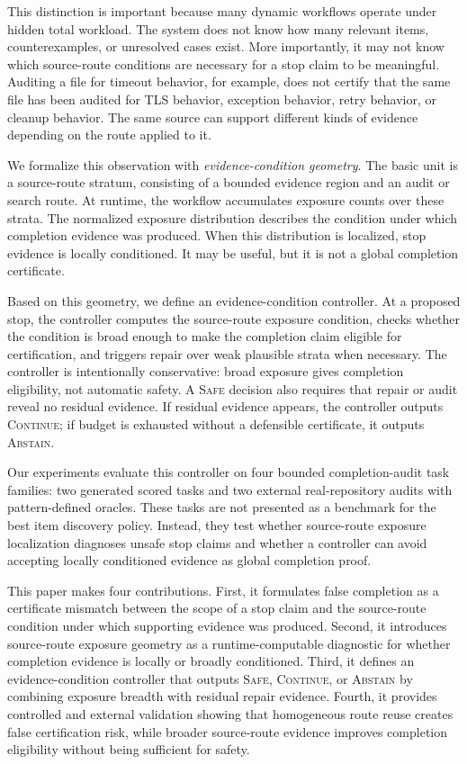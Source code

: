 \documentclass[letterpaper,10pt,twocolumn]{article}
\newcommand{\safe}{\textsc{Safe}}
\newcommand{\cont}{\textsc{Continue}}
\newcommand{\abstain}{\textsc{Abstain}}
\begin{document}
This distinction is important because many dynamic workflows operate under hidden
total workload. The system does not know how many relevant items,
counterexamples, or unresolved cases exist. More importantly, it may not know
which source-route conditions are necessary for a stop claim to be meaningful.
Auditing a file for timeout behavior, for example, does not certify that the same
file has been audited for TLS behavior, exception behavior, retry behavior, or
cleanup behavior. The same source can support different kinds of evidence
depending on the route applied to it.

We formalize this observation with \emph{evidence-condition geometry}. The basic
unit is a source-route stratum, consisting of a bounded evidence region and an
audit or search route. At runtime, the workflow accumulates exposure counts over
these strata. The normalized exposure distribution describes the condition under
which completion evidence was produced. When this distribution is localized,
stop evidence is locally conditioned. It may be useful, but it is not a global
completion certificate.

Based on this geometry, we define an evidence-condition controller. At a proposed
stop, the controller computes the source-route exposure condition, checks whether
the condition is broad enough to make the completion claim eligible for
certification, and triggers repair over weak plausible strata when necessary. The
controller is intentionally conservative: broad exposure gives completion
eligibility, not automatic safety. A \safe{} decision also requires that repair
or audit reveal no residual evidence. If residual evidence appears, the
controller outputs \cont{}; if budget is exhausted without a defensible
certificate, it outputs \abstain{}.

Our experiments evaluate this controller on four bounded completion-audit task
families: two generated scored tasks and two external real-repository audits with
pattern-defined oracles. These tasks are not presented as a benchmark for the
best item discovery policy. Instead, they test whether source-route exposure
localization diagnoses unsafe stop claims and whether a controller can avoid
accepting locally conditioned evidence as global completion proof.

This paper makes four contributions. First, it formulates false completion as a
certificate mismatch between the scope of a stop claim and the source-route
condition under which supporting evidence was produced. Second, it introduces
source-route exposure geometry as a runtime-computable diagnostic for whether
completion evidence is locally or broadly conditioned. Third, it defines an
evidence-condition controller that outputs \safe{}, \cont{}, or \abstain{} by
combining exposure breadth with residual repair evidence. Fourth, it provides
controlled and external validation showing that homogeneous route reuse creates
false certification risk, while broader source-route evidence improves
completion eligibility without being sufficient for safety.
\end{document}
